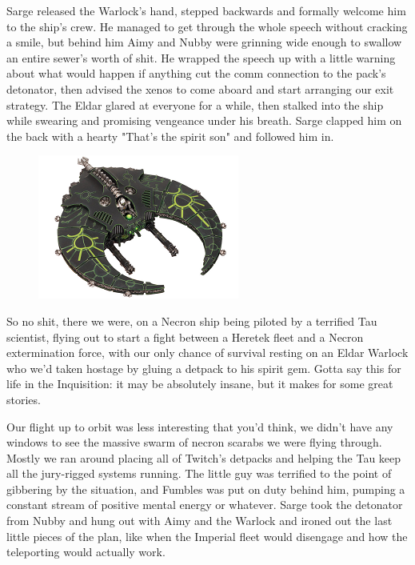 Sarge released the Warlock's hand, stepped backwards and formally welcome him to the ship's crew. 
He managed to get through the whole speech without cracking a smile, but behind him Aimy and Nubby were grinning wide enough to swallow an entire sewer's worth of shit. 
He wrapped the speech up with a little warning about what would happen if anything cut the comm connection to the pack's detonator, then advised the xenos to come aboard and start arranging our exit strategy. 
The Eldar glared at everyone for a while, then stalked into the ship while swearing and promising vengeance under his breath. 
Sarge clapped him on the back with a hearty "That's the spirit son" and followed him in.

\begin{figure}
	\begin{center}
		\includegraphics[width=\figwidth]{pics/11/87.png}
	\end{center}
\end{figure}
So no shit, there we were, on a Necron ship being piloted by a terrified Tau scientist, flying out to start a fight between a Heretek fleet and a Necron extermination force, with our only chance of survival resting on an Eldar Warlock who we'd taken hostage by gluing a detpack to his spirit gem. 
Gotta say this for life in the Inquisition: 
it may be absolutely insane, but it makes for some great stories.

Our flight up to orbit was less interesting that you'd think, we didn't have any windows to see the massive swarm of necron scarabs we were flying through. 
Mostly we ran around placing all of Twitch's detpacks and helping the Tau keep all the jury-rigged systems running. 
The little guy was terrified to the point of gibbering by the situation, and Fumbles was put on duty behind him, pumping a constant stream of positive mental energy or whatever. 
Sarge took the detonator from Nubby and hung out with Aimy and the Warlock and ironed out the last little pieces of the plan, like when the Imperial fleet would disengage and how the teleporting would actually work. 


